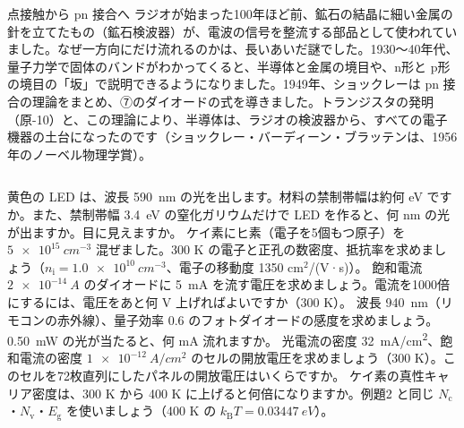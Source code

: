\begin{column}{点接触から pn 接合へ}
ラジオが始まった100年ほど前、鉱石の結晶に細い金属の針を立てたもの（鉱石検波器）が、電波の信号を整流する部品として使われていました。なぜ一方向にだけ流れるのかは、長いあいだ謎でした。1930〜40年代、量子力学で固体のバンドがわかってくると、半導体と金属の境目や、n形と p形の境目の「坂」で説明できるようになりました。1949年、ショックレーは pn 接合の理論をまとめ、⑦のダイオードの式を導きました。トランジスタの発明（原-10）と、この理論により、半導体は、ラジオの検波器から、すべての電子機器の土台になったのです（ショックレー・バーディーン・ブラッテンは、1956年のノーベル物理学賞）。
\end{column}

\bkendproblems
{}
\bkproblem 黄色の LED は、波長 \qty{590}{nm} の光を出します。材料の禁制帯幅は約何 eV ですか。また、禁制帯幅 \qty{3.4}{eV} の窒化ガリウムだけで LED を作ると、何 nm の光が出ますか。目に見えますか。
\bkproblem ケイ素にヒ素（電子を5個もつ原子）を $\qty{5e15}{cm^{-3}}$ 混ぜました。300 K の電子と正孔の数密度、抵抗率を求めましょう（$n_{\mathrm i}=\qty{1.0e10}{cm^{-3}}$、電子の移動度 1350 cm$^2$/(V·s)）。
\bkproblem 飽和電流 $\qty{2e-14}{A}$ のダイオードに \qty{5}{mA} を流す電圧を求めましょう。電流を1000倍にするには、電圧をあと何 V 上げればよいですか（300 K）。
\bkproblem 波長 \qty{940}{nm}（リモコンの赤外線）、量子効率 0.6 のフォトダイオードの感度を求めましょう。\qty{0.50}{mW} の光が当たると、何 mA 流れますか。
\bkproblem 光電流の密度 \qty{32}{mA/cm^2}、飽和電流の密度 $\qty{1e-12}{A/cm^2}$ のセルの開放電圧を求めましょう（300 K）。このセルを72枚直列にしたパネルの開放電圧はいくらですか。
\bkproblem ケイ素の真性キャリア密度は、300 K から 400 K に上げると何倍になりますか。例題2 と同じ $N_{\mathrm c}$・$N_{\mathrm v}$・$E_{\mathrm g}$ を使いましょう（400 K の $k_{\mathrm B}T=\qty{0.03447}{eV}$）。

